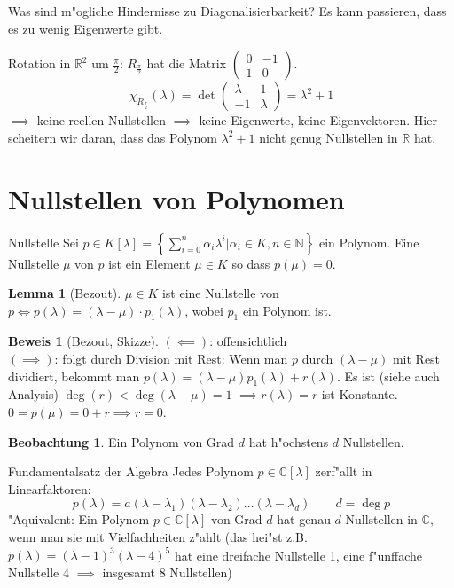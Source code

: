 \documentclass[oneside,fontsize=11pt,paper=a4,BCOR=0mm,DIV=12,automark,headsepline]{scrbook}
\newcommand{\gq}[1]{\glqq{}#1\grqq{}} %
\DeclareMathOperator{\mDeg}{deg}
\theoremstyle{remark}
\theoremstyle{definition}
\newtheorem{beobachtung}{Beobachtung}
\newtheorem{lemma}{Lemma}[section]
\theoremstyle{definition}
\newtheorem*{prof}{Beweis}
\theoremstyle{remark}
\begin{document}
Was sind m"ogliche Hindernisse zu Diagonalisierbarkeit?
Es kann passieren, dass es \gq{zu wenig} Eigenwerte gibt.
\begin{exa}[Rotation]
  Rotation in \(\mathbb{R}^2\) um \(\frac{\pi}{2}\): \(R_{\frac{\pi}{2}}\) hat die Matrix \(
  \begin{pmatrix}
    0 & -1 \\
    1 & 0
  \end{pmatrix}
  \).
  \[\chi_{R_{\frac{\pi}{2}}}(\lambda) = \det
    \begin{pmatrix}
      \lambda & 1\\
      -1 & \lambda
    \end{pmatrix}
    = \lambda^2 + 1
\] \(\implies\) keine reellen Nullstellen \(\implies\) keine Eigenwerte, keine Eigenvektoren. Hier scheitern wir daran, dass das Polynom \(\lambda^2+1\) nicht genug Nullstellen in \(\mathbb{R}\) hat.
\end{exa}

\section{Nullstellen von Polynomen}
\begin{definition}{Nullstelle}{}
  Sei \(p\in K[\lambda] = \left\{\sum_{i=0}^n\alpha_i\lambda^i|\alpha_i\in K, n\in\mathbb{N} \right\}\) ein Polynom. Eine Nullstelle \(\mu\) von \(p\) ist ein Element \(\mu\in K\) so dass \(p(\mu) = 0\).
\end{definition}
\begin{lemma}[Bezout]
  \(\mu\in K\) ist eine Nullstelle von \(p \iff p(\lambda) = (\lambda-\mu)\cdot p_1(\lambda)\), wobei \(p_1\) ein Polynom ist.
\end{lemma}
\begin{prof}[Bezout, Skizze]
  \((\impliedby)\): offensichtlich \\
  \((\implies)\): folgt durch Division mit Rest: Wenn man \(p\) durch \((\lambda-\mu)\) mit Rest dividiert, bekommt man \(p(\lambda) = (\lambda-\mu)p_1(\lambda) + r(\lambda)\). Es ist (siehe auch Analysis) \(\mDeg(r) < \mDeg(\lambda-\mu) = 1\) \(\implies r(\lambda)=r\) ist Konstante. \(0 = p(\mu) = 0 + r \implies r = 0\).
\end{prof}
\begin{beobachtung}
  Ein Polynom von Grad \(d\) hat h"ochstens \(d\) Nullstellen.
\end{beobachtung}
\begin{theo}{Fundamentalsatz der Algebra}
  Jedes Polynom \(p\in\mathbb{C}[\lambda]\) zerf"allt in Linearfaktoren:
  \[p(\lambda) = a(\lambda - \lambda_1)(\lambda-\lambda_2)\dots(\lambda-\lambda_d) \qquad d = \mDeg p\]
  "Aquivalent: Ein Polynom \(p\in\mathbb{C}[\lambda]\) von Grad \(d\) hat genau \(d\) Nullstellen in \(\mathbb{C}\), wenn man sie mit Vielfachheiten z"ahlt (das hei"st z.B. \(p(\lambda) = (\lambda-1)^3(\lambda-4)^5\) hat eine dreifache Nullstelle 1, eine f"unffache Nullstelle 4 \(\implies\) insgesamt 8 Nullstellen)
\end{theo}
\end{document}
